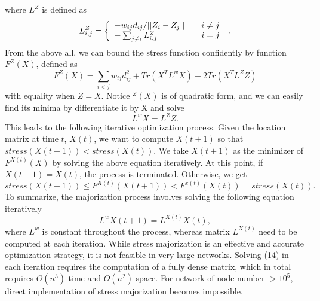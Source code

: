 where $L^{Z}$ is defined as
\[
  L_{i,j}^{Z}=\left\{ 
  \begin{array}{l l}
    -w_{ij}d_{ij}/||Z_{i}-Z_{j}|| \quad & i \neq j\\
    -\sum_{j \neq i}L_{i,j}^{Z} \quad &i=j 
  \end{array} \right. \text{ .}
\]
From the above all, we can bound the stress function confidently by function $F^{Z}(X)$, defined as
\begin{equation}
F^{Z}(X)=\sum_{i<j}w_{ij}d_{ij}^{2}+Tr(X^{T}L^{w}X)-2Tr(X^{T}L^{Z}Z)
\end{equation}
with equality when $Z=X$.
Notice $^{Z}(X)$ is of quadratic form, and we can easily find its minima by differentiate it by X and solve
\[
L^{w}X=L^{Z}Z.
\]
This leads to the following iterative optimization process. Given the location matrix at time $t$, $X(t)$, we want to compute $X(t+1)$ so that $stress(X(t+1)) < stress(X(t))$. We take $X(t+1)$ as the minimizer of $F^{X(t)}(X)$ by solving the above equation iteratively. At this point, if $X(t+1)=X(t)$, the process is terminated. Otherwise, we get
\[
stress(X(t+1)) \leq F^{X(t)}(X(t+1)) < F^{x(t)}(X(t)) =stress(X(t)).
\]
To summarize, the majorization process involves solving the following equation iteratively
\begin{equation}
L^{w}X(t+1)=L^{X(t)}X(t),
\end{equation}
where $L^{w}$ is constant throughout the process, whereas matrix $L^{X(t)}$ need to be computed at each iteration.
While stress majorization is an effective and accurate optimization strategy, it is not feasible in very large networks. Solving (14) in each iteration requires the computation of a fully dense matrix, which in total requires $O(n^3)$ time and $O(n^{2})$ space. For network of node number $> 10^{5}$, direct implementation of stress majorization becomes impossible.
